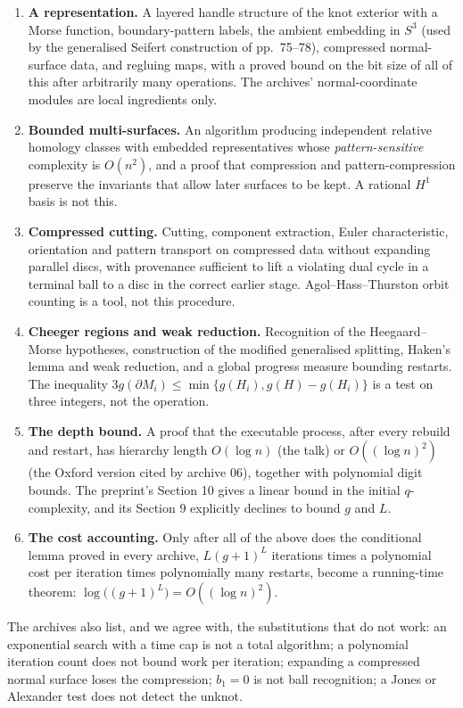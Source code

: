 \documentclass[11pt]{article}
\theoremstyle{remark}
\begin{document}
\begin{enumerate}
\item \textbf{A representation.} A layered handle structure of the knot
  exterior with a Morse function, boundary-pattern labels, the ambient
  embedding in $S^3$ (used by the generalised Seifert construction of
  pp.~75--78), compressed normal-surface data, and regluing maps, with a
  proved bound on the bit size of all of this after arbitrarily many
  operations. The archives' normal-coordinate modules are local ingredients
  only.
\item \textbf{Bounded multi-surfaces.} An algorithm producing independent
  relative homology classes with embedded representatives whose
  \emph{pattern-sensitive} complexity is $O(n^2)$, and a proof that
  compression and pattern-compression preserve the invariants that allow
  later surfaces to be kept. A rational $H^1$ basis is not this.
\item \textbf{Compressed cutting.} Cutting, component extraction, Euler
  characteristic, orientation and pattern transport on compressed data
  without expanding parallel discs, with provenance sufficient to lift a
  violating dual cycle in a terminal ball to a disc in the correct earlier
  stage. Agol--Hass--Thurston orbit counting is a tool, not this procedure.
\item \textbf{Cheeger regions and weak reduction.} Recognition of the
  Heegaard--Morse hypotheses, construction of the modified generalised
  splitting, Haken's lemma and weak reduction, and a global progress measure
  bounding restarts. The inequality $3g(\partial M_i)\le\min\{g(H_i),g(H)-g(H_i)\}$
  is a test on three integers, not the operation.
\item \textbf{The depth bound.} A proof that the executable process, after
  every rebuild and restart, has hierarchy length $O(\log n)$ (the talk) or
  $O((\log n)^2)$ (the Oxford version cited by archive 06), together with
  polynomial digit bounds. The preprint's Section 10 gives a linear bound in
  the initial $q$-complexity, and its Section 9 explicitly declines to bound
  $g$ and $L$.
\item \textbf{The cost accounting.} Only after all of the above does the
  conditional lemma proved in every archive, $L(g+1)^L$ iterations times a
  polynomial cost per iteration times polynomially many restarts, become a
  running-time theorem: $\log\bigl((g+1)^L\bigr)=O((\log n)^2)$.
\end{enumerate}

The archives also list, and we agree with, the substitutions that do not
work: an exponential search with a time cap is not a total algorithm; a
polynomial iteration count does not bound work per iteration; expanding a
compressed normal surface loses the compression; $b_1=0$ is not ball
recognition; a Jones or Alexander test does not detect the unknot.
\end{document}
